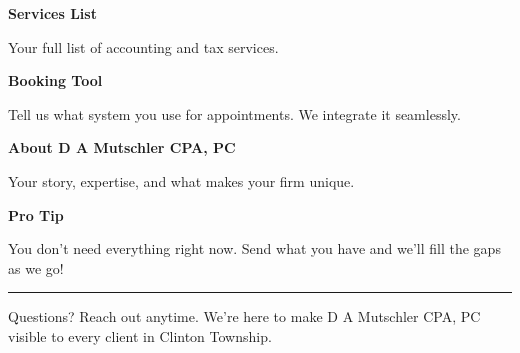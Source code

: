 \documentclass[11pt,letterpaper]{article}
\begin{document}
\begin{minipage}[t]{0.48\textwidth}
\begin{tcolorbox}[colframe=accent-teal, boxrule=1pt, left=0.7em, right=0.7em, top=0.5em, bottom=0.5em, arc=4pt, boxsep=0pt]
{\bfseries\small\color{accent-teal}Services List}

\vspace{0.15em}

{\small Your full list of accounting and tax services.}
\end{tcolorbox}

\vspace{0.1em}

\begin{tcolorbox}[colframe=accent-teal, boxrule=1pt, left=0.7em, right=0.7em, top=0.5em, bottom=0.5em, arc=4pt, boxsep=0pt]
{\bfseries\small\color{accent-teal}Booking Tool}

\vspace{0.15em}

{\small Tell us what system you use for appointments. We integrate it seamlessly.}
\end{tcolorbox}

\vspace{0.1em}

\begin{tcolorbox}[colframe=accent-teal, boxrule=1pt, left=0.7em, right=0.7em, top=0.5em, bottom=0.5em, arc=4pt, boxsep=0pt]
{\bfseries\small\color{accent-teal}About D A Mutschler CPA, PC}

\vspace{0.15em}

{\small Your story, expertise, and what makes your firm unique.}
\end{tcolorbox}

\vspace{-0.2em}
\end{minipage}

\vspace{0.15em}

\begin{tcolorbox}[colback={accent-red!5}, colframe=accent-red!20, boxrule=0.5pt, left=0.7em, right=0.7em, top=0.4em, bottom=0.4em, arc=6pt, boxsep=0pt]

{\bfseries\small\color{accent-red}Pro Tip}

\vspace{0.1em}

{\small You don't need everything right now. Send what you have and we'll fill the gaps as we go!}

\end{tcolorbox}

\vspace{0.15em}

\noindent\hrule
\vspace{0.2em}

{\small\color{text-light}Questions? Reach out anytime. We're here to make D A Mutschler CPA, PC visible to every client in Clinton Township.}
\end{document}
